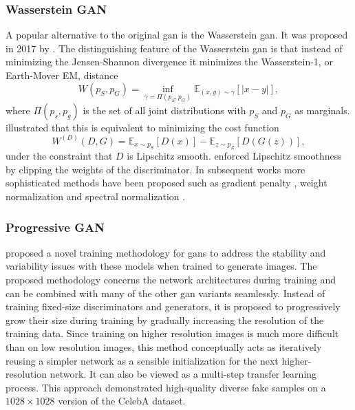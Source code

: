
\subsubsection{Wasserstein GAN}
A popular alternative to the original \acrshort{gan} is the Wasserstein \acrshort{gan}. It was proposed in 2017 by \textcite{arjovsky2017wasserstein}. The distinguishing feature of the Wasserstein \acrshort{gan} is that instead of minimizing the Jensen-Shannon divergence it minimizes the Wasserstein-1, or Earth-Mover EM, distance 
\begin{equation}
    W(p_S, p_G) = \inf_{\gamma = \Pi (p_S, p_G)} \mathbb{E}_{(x, y) \sim \gamma} \left[|x-y|\right],
\end{equation}
where $\Pi(p_s, p_g)$ is the set of all joint distributions with $p_S$ and $p_G$ as marginals. \textcite{arjovsky2017wasserstein} illustrated that this is equivalent to minimizing the cost function
\begin{equation}
    W^{(D)}(D, G) = \mathbb{E}_{x\sim p_S}[D(x)] - \mathbb{E}_{z \sim p_Z}[D(G(z))],
\end{equation}
under the constraint that $D$ is Lipschitz smooth. \textcite{arjovsky2017wasserstein} enforced Lipschitz smoothness by clipping the weights of the discriminator. In subsequent works more sophisticated methods have been proposed such as gradient penalty \parencite{gulrajani2017improved}, weight normalization \parencite{NIPS2016weightnorm} and spectral normalization \parencite{miyato2017spectral}.

\subsubsection{Progressive GAN}
\textcite{karras2017progressive} proposed a novel training methodology for \acrshort{gans} to address the stability and variability issues with these models when trained to generate images. The proposed methodology concerns the network architectures during training and can be combined with many of the other \acrshort{gan} variants seamlessly. Instead of training fixed-size discriminators and generators, it is proposed to progressively grow their size during training by gradually increasing the resolution of the training data. Since training on higher resolution images is much more difficult than on low resolution images, this method conceptually acts as iteratively reusing a simpler network as a sensible initialization for the next higher-resolution network. It can also be viewed as a multi-step transfer learning process. This approach demonstrated high-quality diverse fake samples on a $1028\times1028$ version of the CelebA dataset. 

